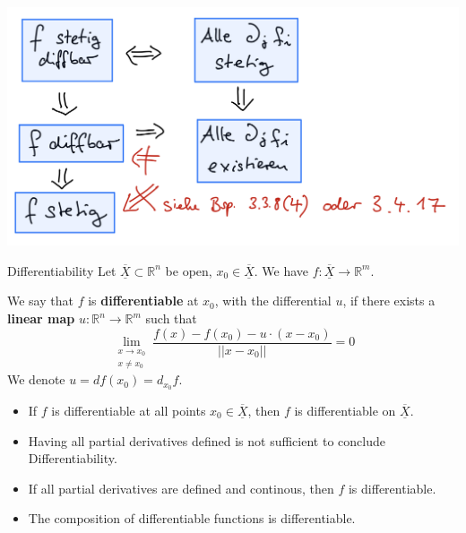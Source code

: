 \documentclass[a4paper,fontsize = 10pt]{article}
\def\R{\mathbb{R}}
\def\X{\underline{\overline{X}}}
\begin{document}
\includegraphics[width=\linewidth]{Implications_Diff.png}

\begin{mainbox}{Differentiability}
    Let $\X \subset \R^n$ be open, $x_0 \in \X$. We have 
    $f: \X \to \R^m$. 

    We say that $f$ is \textbf{differentiable} at $x_0$, with the differential $u$, if there exists a \textbf{linear map} $u: \R^n \to \R^m$ such that 
    \[\lim_{\substack{x \to x_0 \\ x \neq x_0}} \frac{f(x)-f(x_0)-u\cdot(x-x_0)}{||x-x_0||} = 0\]
    We denote $u = df(x_0) = d_{x_0}f$.
\end{mainbox}
\begin{itemize}
    \item If $f$ is differentiable at all points $x_0 \in \X$, then $f$ is differentiable on $\X$.
    \item Having all partial derivatives defined is not sufficient to conclude Differentiability.
    \item If all partial derivatives are defined and continous, then $f$ is differentiable.
    \item The composition of differentiable functions is differentiable.
\end{itemize}
\end{document}
